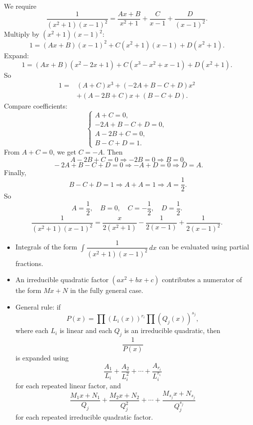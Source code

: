 \begin{solution}
We require
\[
\frac{1}{(x^2+1)(x-1)^2}=\frac{Ax+B}{x^2+1}+\frac{C}{x-1}+\frac{D}{(x-1)^2}.
\]
Multiply by $(x^2+1)(x-1)^2$:
\[
1=(Ax+B)(x-1)^2+C(x^2+1)(x-1)+D(x^2+1).
\]
Expand:
\[
1=(Ax+B)(x^2-2x+1)+C(x^3-x^2+x-1)+D(x^2+1).
\]
So
\[
\begin{aligned}
1={}&(A+C)x^3+(-2A+B-C+D)x^2\\
&+(A-2B+C)x+(B-C+D).
\end{aligned}
\]
Compare coefficients:
\[
\begin{cases}
A+C=0,\\
-2A+B-C+D=0,\\
A-2B+C=0,\\
B-C+D=1.
\end{cases}
\]
From $A+C=0$, we get $C=-A$. Then
\[
\;A-2B+C=0 \Rightarrow -2B=0 \Rightarrow B=0.
\]
\[
\;-2A+B-C+D=0 \Rightarrow -A+D=0 \Rightarrow D=A.
\]
Finally,
\[
\;B-C+D=1 \Rightarrow A+A=1 \Rightarrow A=\frac12.
\]
So
\[
\boxed{A=\frac12,\quad B=0,\quad C=-\frac12,\quad D=\frac12.}
\]
\[
\frac{1}{(x^2+1)(x-1)^2}
=\frac{x}{2(x^2+1)}-\frac{1}{2(x-1)}+\frac{1}{2(x-1)^2}.
\]
\end{solution}

\begin{takeaways}
\begin{itemize}[leftmargin=*]
\item Integrals of the form $\int \dfrac{1}{(x^2+1)(x-1)^2}\,dx$ can be evaluated using partial fractions.
\item An irreducible quadratic factor $(ax^2+bx+c)$ contributes a numerator of the form $Mx+N$ in the fully general case.
\item General rule: if
\[
P(x)=\prod (L_i(x))^{r_i}\prod (Q_j(x))^{s_j},
\]
where each $L_i$ is linear and each $Q_j$ is an irreducible quadratic, then
\[
\frac{1}{P(x)}
\]
is expanded using
\[
\frac{A_1}{L_i}+\frac{A_2}{L_i^2}+\cdots+\frac{A_{r_i}}{L_i^{r_i}}
\]
for each repeated linear factor, and
\[
\frac{M_1x+N_1}{Q_j}+\frac{M_2x+N_2}{Q_j^2}+\cdots+\frac{M_{s_j}x+N_{s_j}}{Q_j^{s_j}}
\]
for each repeated irreducible quadratic factor.
\end{itemize}
\end{takeaways}
